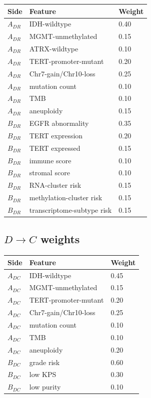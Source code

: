 \documentclass[11pt]{article}
\begin{document}
\begin{longtable}{@{}lll@{}}
\toprule
Side & Feature & Weight\\
\midrule
\endhead
$A_{DR}$ & IDH-wildtype & 0.40\\
$A_{DR}$ & MGMT-unmethylated & 0.15\\
$A_{DR}$ & ATRX-wildtype & 0.10\\
$A_{DR}$ & TERT-promoter-mutant & 0.20\\
$A_{DR}$ & Chr7-gain/Chr10-loss & 0.25\\
$A_{DR}$ & mutation count & 0.10\\
$A_{DR}$ & TMB & 0.10\\
$A_{DR}$ & aneuploidy & 0.15\\
\midrule
$B_{DR}$ & EGFR abnormality & 0.35\\
$B_{DR}$ & TERT expression & 0.20\\
$B_{DR}$ & TERT expressed & 0.15\\
$B_{DR}$ & immune score & 0.10\\
$B_{DR}$ & stromal score & 0.10\\
$B_{DR}$ & RNA-cluster risk & 0.15\\
$B_{DR}$ & methylation-cluster risk & 0.15\\
$B_{DR}$ & transcriptome-subtype risk & 0.15\\
\bottomrule
\end{longtable}

\subsection{$D\to C$ weights}

\begin{longtable}{@{}lll@{}}
\toprule
Side & Feature & Weight\\
\midrule
\endhead
$A_{DC}$ & IDH-wildtype & 0.45\\
$A_{DC}$ & MGMT-unmethylated & 0.15\\
$A_{DC}$ & TERT-promoter-mutant & 0.20\\
$A_{DC}$ & Chr7-gain/Chr10-loss & 0.25\\
$A_{DC}$ & mutation count & 0.10\\
$A_{DC}$ & TMB & 0.10\\
$A_{DC}$ & aneuploidy & 0.20\\
\midrule
$B_{DC}$ & grade risk & 0.60\\
$B_{DC}$ & low KPS & 0.30\\
$B_{DC}$ & low purity & 0.10\\
\bottomrule
\end{longtable}
\end{document}
